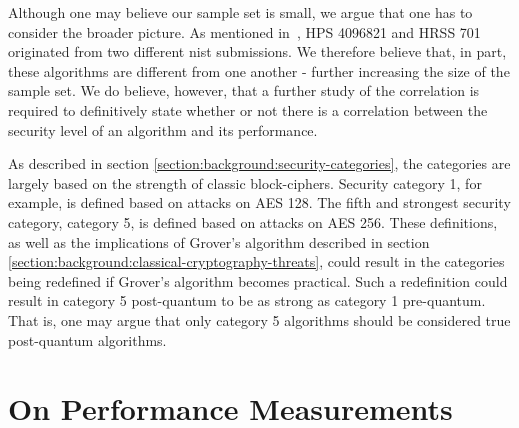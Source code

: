 Although one may believe our sample set is small, we argue that one has to consider the broader picture. As mentioned in~\cite{ntru2020}, HPS 4096821 and HRSS 701 originated from two different \gls{nist} submissions. We therefore believe that, in part, these algorithms are different from one another - further increasing the size of the sample set. We do believe, however, that a further study of the correlation is required to definitively state whether or not there is a correlation between the security level of an algorithm and its performance.

As described in section \ref{section:background:security-categories}, the categories are largely based on the strength of classic block-ciphers. Security category 1, for example, is defined based on attacks on AES 128. The fifth and strongest security category, category 5, is defined based on attacks on AES 256. These definitions, as well as the implications of Grover's algorithm described in section \ref{section:background:classical-cryptography-threats}, could result in the categories being redefined if Grover's algorithm becomes practical. Such a redefinition could result in category 5 post-quantum to be as strong as category 1 pre-quantum. That is, one may argue that only category 5 algorithms should be considered true post-quantum algorithms.

\section{On Performance Measurements}

